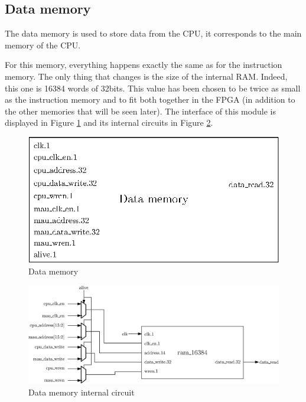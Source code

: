 \subsection{Data memory}

The data memory is used to store data from the CPU, it corresponds to the main memory of the CPU.

For this memory, everything happens exactly the same as for the instruction memory. The only 
thing that changes is the size of the internal RAM. Indeed, this one is 16384 words of 32bits. This 
value has been chosen to be twice as small as the instruction memory and to fit both together in 
the FPGA (in addition to the other memories that will be seen later). The interface of this module
is displayed in Figure \ref{fig:components/dm} and its internal circuits in Figure \ref{fig:components/dm_in}.

\begin{figure}[H]
    \centering
    \includegraphics[scale=0.8]{Chapter3-CPU/res/data_memory}
    \caption{Data memory}
    \label{fig:components/dm}
\end{figure}

\begin{figure}[H]
    \centering
    \includegraphics[width=\linewidth]{Chapter3-CPU/res/data_memory_in}
    \caption{Data memory internal circuit}
    \label{fig:components/dm_in}
\end{figure}

